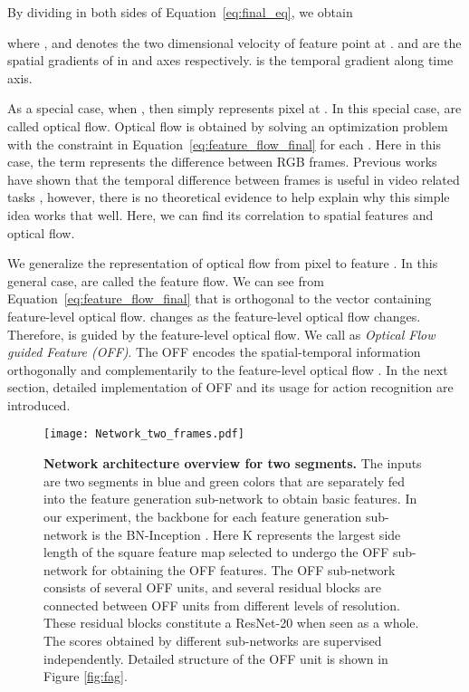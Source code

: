 \documentclass[10pt,twocolumn,letterpaper]{article}
\begin{document}
 By dividing  in both sides of Equation~\ref{eq:final_eq}, we obtain

where , and  denotes the two dimensional velocity of feature point at .  and  are the spatial gradients of  in  and  axes respectively.  is the temporal gradient along time axis. 

As a special case, when , then  simply represents pixel at . In this special case,  are called optical flow. Optical flow is obtained by solving an optimization problem with the constraint in Equation~\ref{eq:feature_flow_final} for each  \cite{barron1994performance,brox2004warpingflow,bigun1991multidimensional}. Here in this case, the term  represents the difference between RGB frames.
Previous works have shown that the temporal difference between frames is useful in video related tasks \cite{wang2016tsn}, however, there is no theoretical evidence to help explain why this simple idea works that well. Here, we can find its correlation to spatial features and optical flow.


We generalize the representation of optical flow from pixel  to feature . In this general case,  are called the feature flow.
We can see from Equation~\ref{eq:feature_flow_final} that  is orthogonal to the vector  containing feature-level optical flow.  changes as the feature-level optical flow changes. Therefore,  is guided by the feature-level optical flow. We call  as \textit{Optical Flow guided Feature (OFF)}. 
The OFF  encodes the spatial-temporal information orthogonally and complementarily to the feature-level optical flow .
In the next section, detailed implementation of OFF and its usage for action recognition are introduced. 




\begin{figure*}[t]
\centering
\texttt{[image: Network\_two\_frames.pdf]}
\caption{\textbf{Network architecture overview for two segments.} The inputs are two segments in blue and green colors that are separately fed into the feature generation sub-network to obtain basic features. In our experiment, the backbone for each feature generation sub-network is the BN-Inception \cite{Szegedycvpr2015googlenet}. Here K represents the largest side length of the square feature map selected to undergo the OFF sub-network for obtaining the OFF features. The OFF sub-network consists of several OFF units, and several residual blocks \cite{he2016resnet} are connected between OFF units from different levels of resolution. These residual blocks constitute a ResNet-20 when seen as a whole. The scores obtained by different sub-networks are supervised independently. Detailed structure of the OFF unit is shown in Figure \ref{fig:fag}.}
\label{fig:overview}
\end{figure*}
\end{document}
